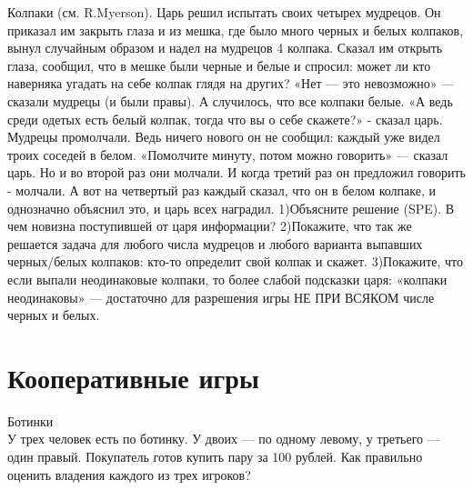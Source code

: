 \begin{problem}
 Колпаки (см. R.Myerson). Царь решил испытать своих
четырех мудрецов. Он приказал им закрыть глаза и из мешка,
где было много черных и белых колпаков, вынул случайным
образом и надел на мудрецов 4 колпака. Сказал им открыть
глаза, сообщил, что в мешке были черные и белые и спросил:
может ли кто наверняка угадать на себе колпак глядя на
других? «Нет — это невозможно» — сказали мудрецы (и были
правы). А случилось, что все колпаки белые. «А ведь среди
одетых есть белый колпак, тогда что вы о себе скажете?» -
сказал царь. Мудрецы промолчали. Ведь ничего нового он не
сообщил: каждый уже видел троих соседей в белом. «Помолчите
минуту, потом можно говорить» — сказал царь. Но и во второй
раз они молчали. И когда третий раз он предложил говорить -
молчали. А вот на четвертый раз каждый сказал, что он в
белом колпаке, и однозначно объяснил это, и царь всех
наградил. 1)Объясните решение (SPE). В чем новизна
поступившей от царя информации? 2)Покажите, что так же
решается задача для любого числа мудрецов и любого варианта
выпавших черных/белых колпаков: кто-то определит свой
колпак и скажет. 3)Покажите, что если выпали неодинаковые
колпаки, то более слабой подсказки царя: «колпаки
неодинаковы» — достаточно для разрешения игры НЕ ПРИ ВСЯКОМ
числе черных и белых.




\begin{sol}

\end{sol}
\end{problem}






\section{Кооперативные игры}

\begin{problem}
 Ботинки\\
У трех человек есть по ботинку. У двоих — по одному левому, у третьего — один правый. Покупатель готов купить пару за 100 рублей. Как правильно оценить владения каждого из трех игроков?




\begin{sol}

\end{sol}
\end{problem}



